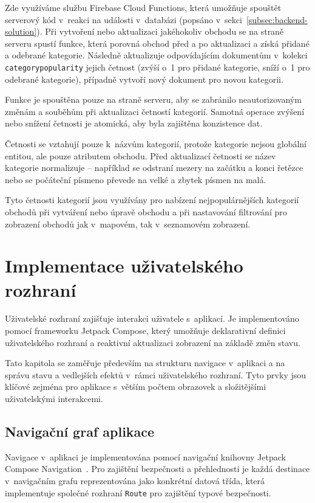 Zde využíváme službu Firebase Cloud Functions, která umožňuje spouštět serverový kód v~reakci na události v~databázi (popsáno v~sekci~\ref{subsec:backend-solution}).
Při vytvoření nebo aktualizaci jakéhokoliv obchodu se na straně serveru spustí funkce, která porovná obchod před a po aktualizaci a získá přidané a odebrané kategorie.
Následně aktualizuje odpovídajícím dokumentům v~kolekci \texttt{category\-popu\-la\-ri\-ty} jejich četnost (zvýší o~1 pro přidané kategorie, sníží o~1 pro odebrané kategorie), případně vytvoří nový dokument pro novou kategorii.

Funkce je spouštěna pouze na straně serveru, aby se zabránilo neautorizovaným změnám a souběhům při aktualizaci četností kategorií.
Samotná operace zvýšení nebo snížení četnosti je atomická, aby byla zajištěna konzistence dat.

Četnosti se vztahují pouze k~názvům kategorií, protože kategorie nejsou globální entitou, ale pouze atributem obchodu.
Před aktualizací četnosti se název kategorie normalizuje -- například se odstraní mezery na začátku a konci řetězce nebo se počáteční písmeno převede na velké a zbytek písmen na malá.

Tyto četnosti kategorií jsou využívány pro nabízení nejpopulárnějších kategorií obchodů při vytváření nebo úpravě obchodu a při nastavování filtrování pro zobrazení obchodů jak v~mapovém, tak v~seznamovém zobrazení.


\section{Implementace uživatelského rozhraní}
Uživatelské rozhraní zajišťuje interakci uživatele s~aplikací.
Je implementováno pomocí frameworku Jetpack Compose, který umožňuje deklarativní definici uživatelského rozhraní a reaktivní aktualizaci zobrazení na základě změn stavu.

Tato kapitola se zaměřuje především na strukturu navigace v~aplikaci a na správu stavu a vedlejších efektů v~rámci uživatelského rozhraní.
Tyto prvky jsou klíčové zejména pro aplikace s~větším počtem obrazovek a složitějšími uživatelskými interakcemi.

\subsection{Navigační graf aplikace}\label{subsec:ui-navigation}
Navigace v~aplikaci je implementována pomocí navigační knihovny Jetpack Compose Navigation~\parencite{compose_navigation}.
Pro zajištění bezpečnosti a přehlednosti je každá destinace v~navigačním grafu reprezentována jako konkrétní datová třída, která implementuje společné rozhraní \texttt{Route} pro zajištění typové bezpečnosti.

